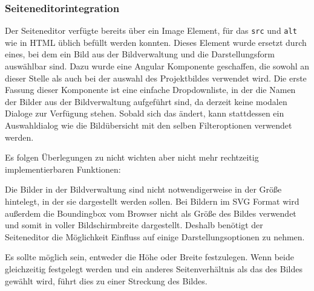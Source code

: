 \subsubsection{Seiteneditorintegration}
\label{subsec:4-page-editor}

Der Seiteneditor verfügte bereits über ein Image Element, für das \texttt{src}
und \texttt{alt} wie in HTML üblich befüllt werden konnten. Dieses Element wurde
ersetzt durch eines, bei dem ein Bild aus der Bildverwaltung und die
Darstellungsform auswählbar sind. Dazu wurde eine Angular Komponente geschaffen,
die sowohl an dieser Stelle als auch bei der auswahl des Projektbildes verwendet
wird. Die erste Fassung dieser Komponente ist eine einfache Dropdownliste, in
der die Namen der Bilder aus der Bildverwaltung aufgeführt sind, da derzeit
keine modalen Dialoge zur Verfügung stehen. Sobald sich das ändert, kann
stattdessen ein Auswahldialog wie die Bildübersicht mit den selben
Filteroptionen verwendet werden.

Es folgen Überlegungen zu nicht wichten aber nicht mehr rechtzeitig
implementierbaren Funktionen:

Die Bilder in der Bildverwaltung sind nicht notwendigerweise in der Größe
hintelegt, in der sie dargestellt werden sollen. Bei Bildern im SVG Format
wird außerdem die Boundingbox vom Browser nicht als Größe des Bildes verwendet
und somit in voller Bildschirmbreite dargestellt. Deshalb benötigt der
Seiteneditor die Möglichkeit Einfluss auf einige Darstellungsoptionen zu nehmen.

Es sollte möglich sein, entweder die Höhe oder Breite festzulegen. Wenn beide
gleichzeitig festgelegt werden und ein anderes Seitenverhältnis als das des
Bildes gewählt wird, führt dies zu einer Streckung des Bildes.

